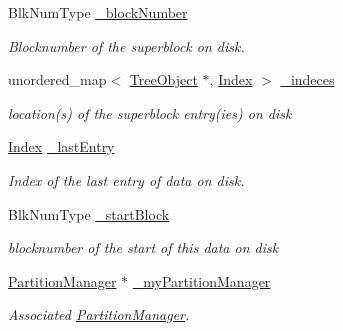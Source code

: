 \begin{DoxyCompactItemize}
Blk\+Num\+Type \mbox{\hyperlink{classTreeObject_a17cfa5bde700978b4ec326909362bd2c}{\+\_\+block\+Number}}
\begin{DoxyCompactList}\small\item\em Blocknumber of the superblock on disk. \end{DoxyCompactList}\item 
\mbox{\label{classTreeObject_ae79eb5bd12c820b50f5d10c3f9b5dc66}} 
unordered\+\_\+map$<$ \mbox{\hyperlink{classTreeObject}{Tree\+Object}} $\ast$, \mbox{\hyperlink{structindex}{Index}} $>$ \mbox{\hyperlink{classTreeObject_ae79eb5bd12c820b50f5d10c3f9b5dc66}{\+\_\+indeces}}
\begin{DoxyCompactList}\small\item\em location(s) of the superblock entry(ies) on disk \end{DoxyCompactList}\item 
\mbox{\label{classTreeObject_a1418b7078e9fbb06506a310ad9417c52}} 
\mbox{\hyperlink{structindex}{Index}} \mbox{\hyperlink{classTreeObject_a1418b7078e9fbb06506a310ad9417c52}{\+\_\+last\+Entry}}
\begin{DoxyCompactList}\small\item\em Index of the last entry of data on disk. \end{DoxyCompactList}\item 
\mbox{\label{classTreeObject_a5872ffdaa0c1a0cbf393da9a8a7657f3}} 
Blk\+Num\+Type \mbox{\hyperlink{classTreeObject_a5872ffdaa0c1a0cbf393da9a8a7657f3}{\+\_\+start\+Block}}
\begin{DoxyCompactList}\small\item\em blocknumber of the start of this data on disk \end{DoxyCompactList}\item 
\mbox{\label{classTreeObject_a0b2ab130a5b95945bbd81250f667d63b}} 
\mbox{\hyperlink{classPartitionManager}{Partition\+Manager}} $\ast$ \mbox{\hyperlink{classTreeObject_a0b2ab130a5b95945bbd81250f667d63b}{\+\_\+my\+Partition\+Manager}}
\begin{DoxyCompactList}\small\item\em Associated \mbox{\hyperlink{classPartitionManager}{Partition\+Manager}}. \end{DoxyCompactList}\end{DoxyCompactItemize}


